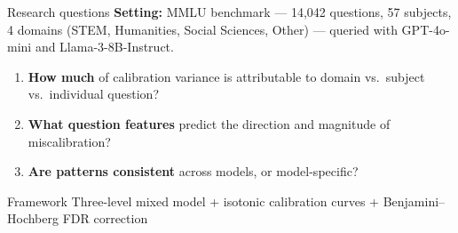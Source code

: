 \documentclass[aspectratio=169,11pt]{beamer}
\begin{document}

\begin{frame}{Research questions}
\textbf{Setting:} MMLU benchmark --- 14{,}042 questions, 57 subjects, 4 domains
(STEM, Humanities, Social Sciences, Other) --- queried with GPT-4o-mini and
Llama-3-8B-Instruct.

\vspace{0.8em}
\begin{enumerate}
  \item \textbf{How much} of calibration variance is attributable to domain vs.\ subject
    vs.\ individual question?
  \item \textbf{What question features} predict the direction and magnitude of
    miscalibration?
  \item \textbf{Are patterns consistent} across models, or model-specific?
\end{enumerate}

\vspace{0.8em}
\begin{block}{Framework}
  Three-level mixed model + isotonic calibration curves
  + Benjamini--Hochberg FDR correction
\end{block}
\end{frame}

\end{document}
